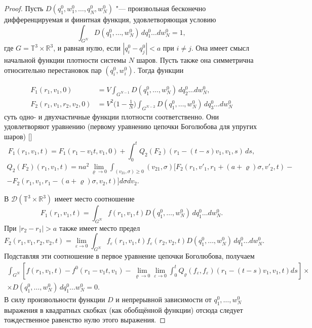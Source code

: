 \begin{proof}
Пусть $D(q_1^0,w_1^0,\ldots,q_N^0,w_N^0)$ "--- произвольная бесконечно дифференцируемая и финитная функция, удовлетворяющая условию
$$\int_{G^N}D(q_1^0,\ldots,w^0_N)\,dq_1^0\ldots dw^0_N=1,$$
где $G=\mathbb{T}^3\times\mathbb{R}^3$, и равная нулю, если $|q_i^0-q_j^0|<a$ при $i\neq j$. Она имеет смысл начальной функции плотности системы $N$ шаров. Пусть также она симметрична относительно перестановок пар $(q_i^0,w_i^0)$. Тогда функции

\begin{equation*}%
\begin{aligned}
F_1(r_1,v_1,0)&=V\int_{G^{N-1}} D(q_1^0,\ldots,w^0_N)\,dq^0_2\ldots dw^0_N,\\
F_2(r_1,v_1,r_2,v_2,0)&=V^2\bigl(1-\frac 1N\bigr)\int_{G^{N-2}}D(q^0_1,\ldots,w^0_N)\,dq^0_3\ldots dw^0_N
\end{aligned}\end{equation*}
суть одно- и двухчастичные функции плотности соответственно. Они удовлетворяют уравнению (первому уравнению цепочки Боголюбова для упругих шаров) []
\begin{equation}\label{EqBEB}
F_1(r_1,v_1,t)=F_1(r_1-v_1t,v_1,0)+\int_0^tQ_2(F_2)(r_1-(t-s)v_1,v_1,s)\,ds,
\end{equation}
\begin{multline}\label{EqQBEB}
Q_2(F_2)(r_1,v_1,t)=na^2\lim_{\varrho\to0}\int_{(v_{21},\sigma)\geq0}
(v_{21},\sigma)[F_2(r_1,v'_1,r_1+(a+\varrho)\sigma,v'_2,t)-\\-F_2(r_1,v_1,r_1-(a+\varrho)\sigma,v_2,t)]d\sigma dv_2.
\end{multline}

В $\mathscr D(\mathbb{T}^3\times\mathbb{R}^3)$ имеет место соотношение
\begin{equation}\label{EqF1}
F_1(r_1,v_1,t)=\int_{G^N} f(r_1,v_1,t)D(q_1^0,\ldots,w^0_N)\,dq_1^0\ldots dw^0_N.
\end{equation}
При $|r_2-r_1|>a$ также имеет место предел
\begin{equation}\label{EqF2}
F_2(r_1,v_1,r_2,v_2,t)=\lim_{\varepsilon\to0}\int_{G^N} f_\varepsilon(r_1,v_1,t)f_\varepsilon(r_2,v_2,t)D(q_1^0,\ldots,w^0_N)\,dq_1^0\ldots dw^0_N.
\end{equation}
Подставляя эти соотношение в первое уравнение цепочки Боголюбова, получаем
\begin{multline*}
\int_{G^N}[f(r_1,v_1,t)-f^0(r_1-v_1t,v_1)-\lim_{\varrho\to0}\lim_{\varepsilon\to0}\int_0^tQ_\varrho(f_\varepsilon,f_\varepsilon)(r_1-(t-s)v_1,v_1,t)ds]\times\\\times D(q_1^0,\ldots,w_N^0)\,dq_1^0\ldots w_N^0=0.
\end{multline*}
В силу произвольности функции $D$ и непрерывной зависимости от $q_1^0,\ldots,w_N^0$ выражения в квадратных скобках (как обобщённой функции)  отсюда следует тождественное равенство нулю этого выражения.
\end{proof}

